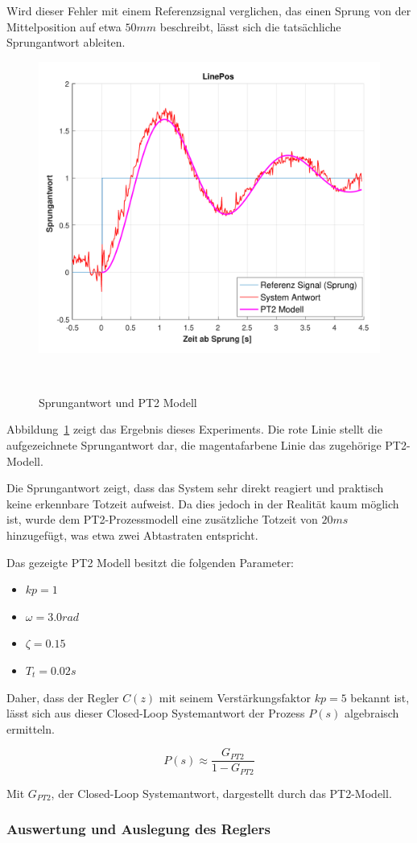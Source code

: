 \documentclass[main.tex]{subfiles} %
\begin{document}
Wird dieser Fehler mit einem Referenzsignal verglichen, das einen Sprung von
der Mittelposition auf etwa $50mm$ beschreibt, lässt sich die tatsächliche
Sprungantwort ableiten.

\begin{figure}[H]
    \centering
    \includegraphics[width=0.5\linewidth]{fig_Parametrierung_Linienfolgeregler/Sprungantwort_System.pdf}
    \caption{Sprungantwort und PT2 Modell}~\label{fig:Sprungantwort}
\end{figure}

Abbildung~\ref{fig:Sprungantwort} zeigt das Ergebnis dieses Experiments. Die
rote Linie stellt die aufgezeichnete Sprungantwort dar, die magentafarbene
Linie das zugehörige PT2-Modell.

Die Sprungantwort zeigt, dass das System sehr direkt reagiert und praktisch
keine erkennbare Totzeit aufweist. Da dies jedoch in der Realität kaum möglich
ist, wurde dem PT2-Prozessmodell eine zusätzliche Totzeit von $20ms$
hinzugefügt, was etwa zwei Abtastraten entspricht.

Das gezeigte PT2 Modell besitzt die folgenden Parameter:

\begin{itemize}
    \item $kp = 1$
    \item $\omega = 3.0 rad$
    \item $\zeta = 0.15$
    \item $T_t = 0.02 s$
\end{itemize}

Daher, dass der Regler $C(z)$ mit seinem Verstärkungsfaktor $kp = 5$ bekannt
ist, lässt sich aus dieser Closed-Loop Systemantwort der Prozess $P(s)$
algebraisch ermitteln.

\[
    P(s) \approx \frac{G_{PT2}}{1 - G_{PT2}}
\]

Mit $G_{PT2}$, der Closed-Loop Systemantwort, dargestellt durch das PT2-Modell.

\subsubsection*{Auswertung und Auslegung des Reglers}
\end{document}
